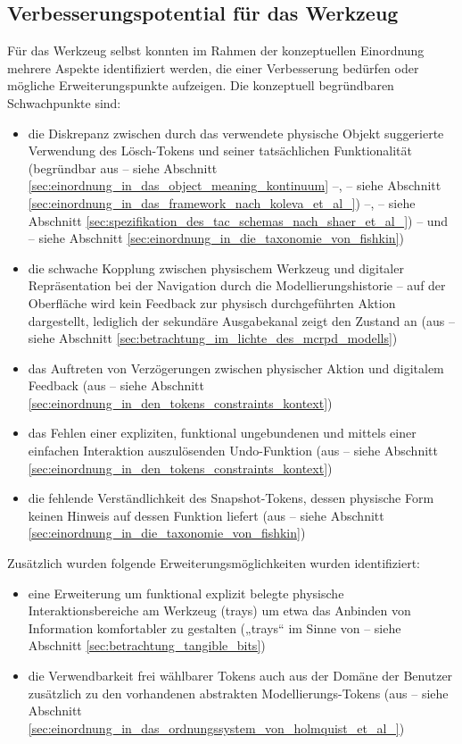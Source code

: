 
\subsection{Verbesserungspotential für das Werkzeug} %
\label{sub:verbesserungspotential_für_das_werkzeug}

Für das Werkzeug selbst konnten im Rahmen der konzeptuellen Einordnung mehrere Aspekte identifiziert werden, die einer Verbesserung bedürfen oder mögliche Erweiterungspunkte aufzeigen. Die konzeptuell begründbaren Schwachpunkte sind:
\begin{itemize}
	\item die Diskrepanz zwischen durch das verwendete physische Objekt suggerierte Verwendung des Lösch-Tokens und seiner tatsächlichen Funktionalität (begründbar aus \citep{Underkoffler99} -- siehe Abschnitt \ref{sec:einordnung_in_das_object_meaning_kontinuum} --, \citep{Koleva03} -- siehe Abschnitt \ref{sec:einordnung_in_das_framework_nach_koleva_et_al_}) --, \citep{Shaer04} -- siehe Abschnitt \ref{sec:spezifikation_des_tac_schemas_nach_shaer_et_al_}) -- und \citep{Fishkin04} -- siehe Abschnitt \ref{sec:einordnung_in_die_taxonomie_von_fishkin})
	\item die schwache Kopplung zwischen physischem Werkzeug und digitaler Repräsentation bei der Navigation durch die Modellierungshistorie -- auf der Oberfläche wird kein Feedback zur physisch durchgeführten Aktion dargestellt, lediglich der sekundäre Ausgabekanal zeigt den Zustand an (aus \citep{Ullmer00} -- siehe Abschnitt \ref{sec:betrachtung_im_lichte_des_mcrpd_modells})
	\item das Auftreten von Verzögerungen zwischen physischer Aktion und digitalem Feedback (aus \citep{Bellotti02} -- siehe Abschnitt \ref{sec:einordnung_in_den_tokens_constraints_kontext})
	\item das Fehlen einer expliziten, funktional ungebundenen und mittels einer einfachen Interaktion auszulösenden Undo-Funktion (aus \citep{Bellotti02} -- siehe Abschnitt \ref{sec:einordnung_in_den_tokens_constraints_kontext})
	\item die fehlende Verständlichkeit des Snapshot-Tokens, dessen physische Form keinen Hinweis auf dessen Funktion liefert (aus \citep{Fishkin04} -- siehe Abschnitt \ref{sec:einordnung_in_die_taxonomie_von_fishkin})
\end{itemize}

Zusätzlich wurden folgende Erweiterungsmöglichkeiten wurden identifiziert:
\begin{itemize}
	\item eine Erweiterung um funktional explizit belegte physische Interaktionsbereiche am Werkzeug (trays) um etwa das Anbinden von Information komfortabler zu gestalten („trays“ im Sinne von \citep{Ishii97} -- siehe Abschnitt \ref{sec:betrachtung_tangible_bits})
	\item die Verwendbarkeit frei wählbarer Tokens auch aus der Domäne der Benutzer zusätzlich zu den vorhandenen abstrakten Modellierungs-Tokens (aus \citep{Holmquist99} -- siehe Abschnitt \ref{sec:einordnung_in_das_ordnungssystem_von_holmquist_et_al_})
\end{itemize}

